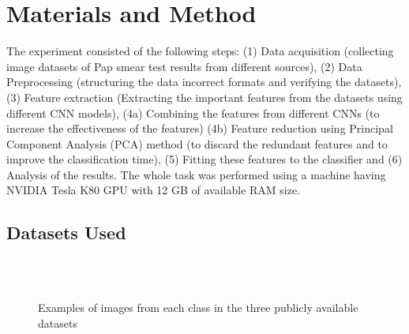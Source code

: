 \documentclass{llncs}
\begin{document}
\section{Materials and Method}\label{methods}
The experiment consisted of the following steps: (1) Data acquisition (collecting image datasets of Pap smear test results from different sources), (2) Data Preprocessing (structuring the data incorrect formats and verifying the datasets), (3) Feature extraction (Extracting the important features from the datasets using different CNN models), (4a) Combining the features from different CNNs (to increase the effectiveness of the features) (4b) Feature reduction using Principal Component Analysis (PCA) method (to discard the redundant features and to improve the classification time), (5) Fitting these features to the classifier and (6) Analysis of the results. The whole task was performed using a machine having NVIDIA Tesla K80 GPU with 12 GB of available RAM size.

\subsection{Datasets Used}
\begin{figure*}
\begin{adjustwidth}{-1.5cm}{}
    \centering
    \\
    \\
    \caption{Examples of images from each class in the three publicly available datasets}
    \label{data}
\end{adjustwidth}
\end{figure*}
\end{document}
